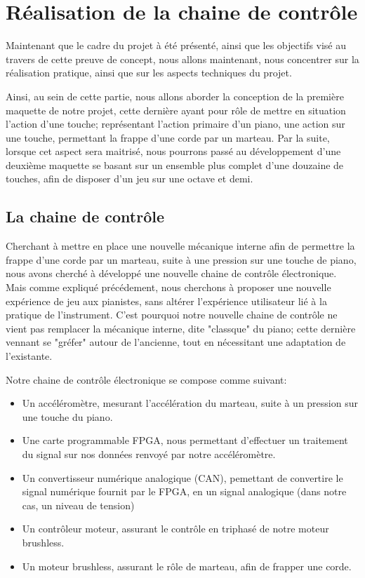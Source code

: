 \documentclass[french,a4paper,12pt]{report}
\begin{document}
	\part{Réalisation de la chaine de contrôle}	
	
	Maintenant que le cadre du projet à été présenté, ainsi que les objectifs visé au travers de cette preuve de concept, nous allons maintenant, nous concentrer sur la réalisation pratique, ainsi que sur les aspects techniques du projet.
	
	Ainsi, au sein de cette partie, nous allons aborder la conception de la première maquette de notre projet, cette dernière ayant pour rôle de mettre en situation l'action d'une touche; représentant l'action primaire d'un piano, une action sur une touche, permettant la frappe d'une corde par un marteau. Par la suite, lorsque cet aspect sera maitrisé, nous pourrons passé au développement d'une deuxième maquette se basant sur un ensemble plus complet d'une douzaine de touches, afin de disposer d'un jeu sur une octave et demi.
	
		\chapter{La chaine de contrôle}
		
		Cherchant à mettre en place une nouvelle mécanique interne afin de permettre la frappe d'une corde par un marteau, suite à une pression sur une touche de piano, nous avons cherché à développé une nouvelle chaine de contrôle électronique.
		Mais comme expliqué précédement, nous cherchons à proposer une nouvelle expérience de jeu aux pianistes, sans altérer l'expérience utilisateur lié à la pratique de l'instrument. C'est pourquoi notre nouvelle chaine de contrôle ne vient pas remplacer la mécanique interne, dite "classque" du piano; cette dernière vennant se "gréfer" autour de l'ancienne, tout en nécessitant une adaptation de l'existante.
		
		Notre chaine de contrôle électronique se compose comme suivant:
		\begin{itemize}
			\item Un accéléromètre, mesurant l'accélération du marteau, suite à un pression sur une touche du piano.
			\item Une carte programmable FPGA, nous permettant d'effectuer un traitement du signal sur nos données renvoyé par notre accéléromètre.
			\item Un convertisseur numérique analogique (CAN), pemettant de convertire le signal numérique fournit par le FPGA, en un signal analogique (dans notre cas, un niveau de tension)
			\item Un contrôleur moteur, assurant le contrôle en triphasé de notre moteur brushless.
			\item Un moteur brushless, assurant le rôle de marteau, afin de frapper une corde.
		\end{itemize}
		
\end{document}
